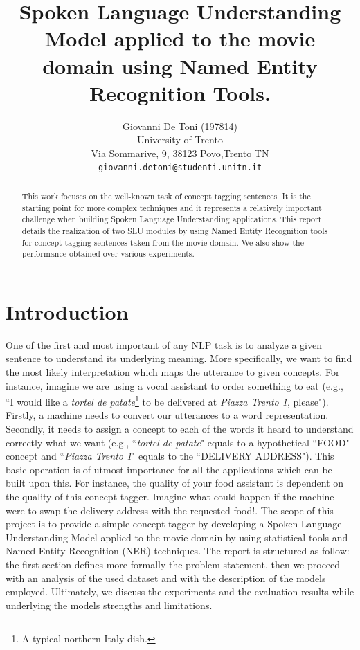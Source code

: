 \documentclass[11pt,a4paper]{article}
\title{Spoken Language Understanding Model applied to the movie domain using Named Entity Recognition Tools.}
\author{Giovanni De Toni (197814) \\
  University of Trento \\ Via Sommarive, 9, 38123 Povo,Trento TN\\
  \texttt{giovanni.detoni@studenti.unitn.it}}
\date{}
\begin{document}
\maketitle

\begin{abstract}
This work focuses on the well-known task of concept tagging sentences.  It is the starting point for more complex techniques and it represents a relatively important challenge when building Spoken Language Understanding applications. This report details the realization of two SLU modules by using Named Entity Recognition tools for concept tagging sentences taken from the movie domain. We also show the performance obtained over various experiments.
\end{abstract}

\section{Introduction}
One of the first and most important of any NLP task is to analyze a given sentence to understand its underlying meaning. More specifically, we want to find the most likely interpretation which maps the utterance to given concepts. For instance, imagine we are using a vocal assistant to order something to eat (e.g., ``I would like a \textit{tortel de patate}\footnote{A typical northern-Italy dish.} to be delivered at \textit{Piazza Trento 1}, please"). Firstly, a machine needs to convert our utterances to a word representation. Secondly, it needs to assign a concept to each of the words it heard to understand correctly what we want (e.g., ``\textit{tortel de patate}" equals to a hypothetical ``FOOD" concept and ``\textit{Piazza Trento 1}" equals to the ``DELIVERY ADDRESS").
This basic operation is of utmost importance for all the applications which can be built upon this. For instance, the quality of your food assistant is dependent on the quality of this concept tagger. Imagine what could happen if the machine were to swap the delivery address with the requested food!.  
The scope of this project is to provide a simple concept-tagger by developing a Spoken Language Understanding Model applied to the movie domain by using statistical tools and Named Entity Recognition (NER) techniques.
The report is structured as follow: the first section defines more formally the problem statement, then we proceed with an analysis of the used dataset and with the description of the models employed. Ultimately, we discuss the experiments and the evaluation results while underlying the models strengths and limitations.
\end{document}
